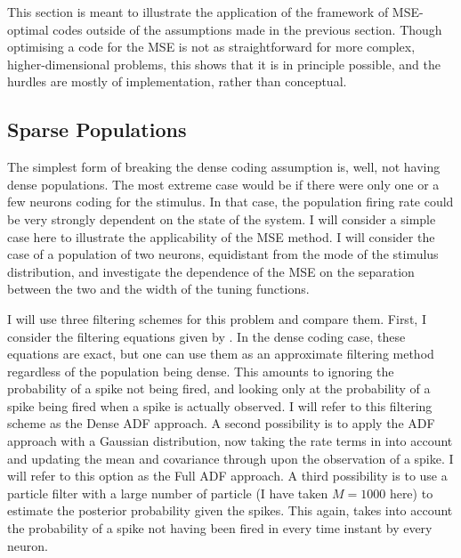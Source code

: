 This section is meant to illustrate the application of the framework of MSE-optimal codes outside of the assumptions made in the previous section. Though optimising a code for
the MSE is not as straightforward for more complex, higher-dimensional problems, this shows that it is in principle possible, and the hurdles are mostly of implementation, rather
than conceptual.


\subsection{Sparse Populations}

The simplest form of breaking the dense coding assumption is, well, not having dense populations. The most extreme case would be if there were only one or
a few neurons coding for the stimulus. In that case, the population firing rate could be very strongly dependent on the state of the system. I will consider a simple
case here to illustrate the applicability of the MSE method. I will consider the case of a population of two neurons, equidistant from the mode of the stimulus distribution,
and investigate the dependence of the MSE on the separation between the two and the width of the tuning functions.\par

I will use three filtering schemes for this problem and compare them. First, I consider
the filtering equations given by . In the dense coding case, these equations are exact, but one can use them as an approximate filtering method
regardless of the population being dense. This amounts to ignoring the probability of a spike not being fired, and looking only at the probability of a spike being fired when a spike is
actually observed. I will refer to this filtering scheme as the Dense ADF approach. A second possibility is to apply the ADF approach with a Gaussian distribution, now taking the rate 
terms in  into account and updating the mean and covariance through  upon the observation of a spike. I will refer to this option as 
the Full ADF approach. A third possibility is to use a particle filter with a large number of particle (I have taken $M=1000$ here) to estimate the posterior probability given the spikes.
This again, takes into  account the probability of a spike not having been fired in every time instant by every neuron.\par

